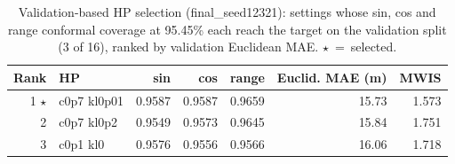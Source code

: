 \begin{table}[t]
\centering
\caption{Validation-based HP selection (final_seed12321): settings whose sin, cos and range conformal coverage at 95.45\% each reach the target on the validation split (3 of 16), ranked by validation Euclidean MAE. $\star$~=~selected.}
\label{tab:hp_selection_final_seed12321}
\begin{tabular}{rlrrrrr}
\toprule
Rank & HP & sin & cos & range & Euclid. MAE (m) & MWIS \\
\midrule
1 $\star$ & c0p7 kl0p01 & 0.9587 & 0.9587 & 0.9659 & 15.73 & 1.573 \\
2 & c0p7 kl0p2 & 0.9549 & 0.9573 & 0.9645 & 15.84 & 1.751 \\
3 & c0p1 kl0 & 0.9576 & 0.9556 & 0.9566 & 16.06 & 1.718 \\
\bottomrule
\end{tabular}
\end{table}